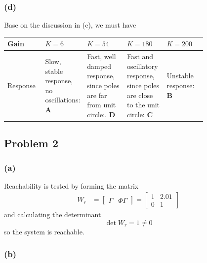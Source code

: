 \documentclass[letterpaper,12pt]{article}
\newcommand{\bbm}{\begin{bmatrix}}
\newcommand{\ebm}{\end{bmatrix}}
\begin{document}
\subsubsection*{(d)}
Base on the discussion in (c), we must have

\begin{center}
\begin{tabular}{|l|p{0.2\linewidth}|p{0.2\linewidth}|p{0.2\linewidth}|p{0.2\linewidth}|}
\hline
Gain & $K=6$ & $K=54$ & $K=180$ & $K=200$\\ \hline
Response & Slow, stable response, no oscillations: \textbf{A} & Fast, well damped response, since poles are far from unit circle:. \textbf{D} & Fast and oscillatory response, since poles are close to the unit circle: \textbf{C} & Unstable response: \textbf{B}\\\hline
\end{tabular}
\end{center}
\subsection*{Problem 2}

\subsubsection*{(a)}
Reachability is tested by forming the matrix
\begin{equation*}
\begin{split}
  W_r &= \bbm \Gamma & \Phi \Gamma \ebm = \bbm 1 &  2.01 \\0 & 1 \ebm 
\end{split}
\end{equation*}
and calculating the determinant
\[ \det W_r = 1 \neq 0 \]
so the system is reachable.

 
\subsubsection*{(b)}
\end{document}
